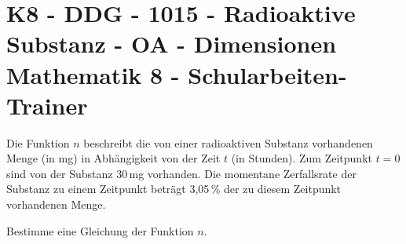 \section{K8 - DDG - 1015 - Radioaktive Substanz - OA - Dimensionen Mathematik 8 - Schularbeiten-Trainer}

\begin{beispiel}[K8 - DDG]{1}
Die Funktion $n$ beschreibt die von einer radioaktiven Substanz vorhandenen Menge (in mg) in Abhängigkeit von der Zeit $t$ (in Stunden). Zum Zeitpunkt $t=0$ sind von der Substanz 30\,mg vorhanden. Die momentane Zerfallsrate der Substanz zu einem Zeitpunkt beträgt 3,05\,\% der zu diesem Zeitpunkt vorhandenen Menge.

Bestimme eine Gleichung der Funktion $n$.

\end{beispiel}